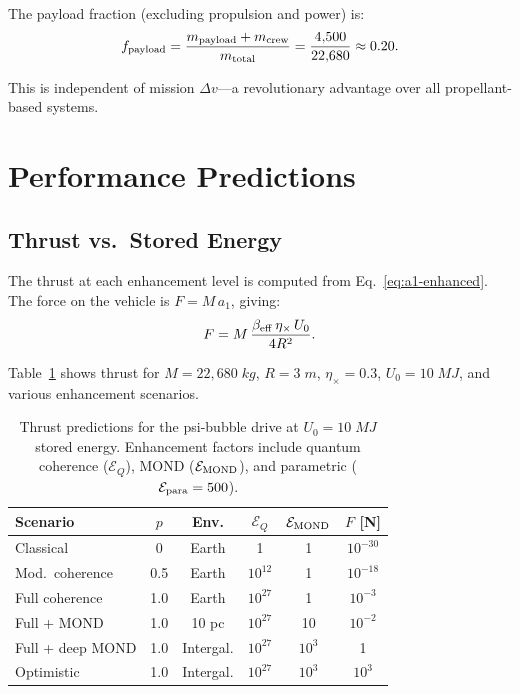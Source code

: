 \documentclass[twocolumn,prl,superscriptaddress,nofootinbib,longbibliography,floatfix]{revtex4-2}
\begin{document}
The payload fraction (excluding propulsion and power) is:
\begin{equation}
f_{\rm payload} = \frac{m_{\rm payload} + m_{\rm crew}}{m_{\rm total}}
= \frac{4{,}500}{22{,}680} \approx 0.20.
\label{eq:payload-fraction}
\end{equation}

This is independent of mission $\Delta v$---a revolutionary advantage
over all propellant-based systems.

\section{Performance Predictions}\label{sec:performance}

\subsection{Thrust vs.\ Stored Energy}

The thrust at each enhancement level is computed from
Eq.~\eqref{eq:a1-enhanced}.  The force on the vehicle is
$F = M\,a_1$, giving:
\begin{equation}
F = M\,\frac{\beta_{\rm eff}\,\eta_\times\,U_0}{4R^2}.
\label{eq:thrust-force}
\end{equation}

Table~\ref{tab:thrust} shows thrust for $M = 22{,}680\;\si{kg}$,
$R = 3\;\si{m}$, $\eta_\times = 0.3$, $U_0 = 10\;\si{MJ}$, and
various enhancement scenarios.

\begin{table}[h]
\centering
\caption{Thrust predictions for the psi-bubble drive at
$U_0 = 10\;\si{MJ}$ stored energy.  Enhancement factors include
quantum coherence ($\mathcal{E}_Q$), MOND ($\mathcal{E}_{\rm MOND}$),
and parametric ($\mathcal{E}_{\rm para} = 500$).}
\label{tab:thrust}
\begin{ruledtabular}
\begin{tabular}{lccccc}
Scenario & $p$ & Env. & $\mathcal{E}_Q$ & $\mathcal{E}_{\rm MOND}$
& $F$ [N] \\
\hline
Classical & 0 & Earth & 1 & 1 & $10^{-30}$ \\
Mod.\ coherence & 0.5 & Earth & $10^{12}$ & 1 & $10^{-18}$ \\
Full coherence & 1.0 & Earth & $10^{27}$ & 1 & $10^{-3}$ \\
Full + MOND & 1.0 & 10 pc & $10^{27}$ & 10 & $10^{-2}$ \\
Full + deep MOND & 1.0 & Intergal. & $10^{27}$ & $10^3$ & 1 \\
Optimistic & 1.0 & Intergal. & $10^{27}$ & $10^3$ & $10^3$ \\
\end{tabular}
\end{ruledtabular}
\end{table}
\end{document}

